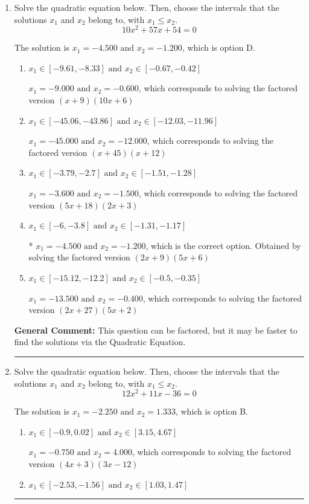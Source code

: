\documentclass{extbook}[14pt]
\newcommand{\litem}[1]{\item #1

\rule{\textwidth}{0.4pt}}
\begin{document}
\begin{enumerate}\litem{
Solve the quadratic equation below. Then, choose the intervals that the solutions $x_1$ and $x_2$ belong to, with $x_1 \leq x_2$.
\[ 10x^{2} +57 x + 54 = 0 \]

The solution is \( x_1 = -4.500 \text{ and } x_2 = -1.200 \), which is option D.\begin{enumerate}[label=\Alph*.]
\item \( x_1 \in [-9.61, -8.33] \text{ and } x_2 \in [-0.67, -0.42] \)

$x_1 = -9.000 \text{ and } x_2 = -0.600$, which corresponds to solving the factored version $(x + 9)(10x + 6)$
\item \( x_1 \in [-45.06, -43.86] \text{ and } x_2 \in [-12.03, -11.96] \)

$x_1 = -45.000 \text{ and } x_2 = -12.000$, which corresponds to solving the factored version $(x + 45)(x + 12)$
\item \( x_1 \in [-3.79, -2.7] \text{ and } x_2 \in [-1.51, -1.28] \)

$x_1 = -3.600 \text{ and } x_2 = -1.500$, which corresponds to solving the factored version $(5x + 18)(2x + 3)$
\item \( x_1 \in [-6, -3.8] \text{ and } x_2 \in [-1.31, -1.17] \)

* $x_1 = -4.500 \text{ and } x_2 = -1.200$, which is the correct option. Obtained by solving the factored version $(2x + 9)(5x + 6)$
\item \( x_1 \in [-15.12, -12.2] \text{ and } x_2 \in [-0.5, -0.35] \)

$x_1 = -13.500 \text{ and } x_2 = -0.400$, which corresponds to solving the factored version $(2x + 27)(5x + 2)$
\end{enumerate}

\textbf{General Comment:} This question can be factored, but it may be faster to find the solutions via the Quadratic Equation.
}
\litem{
Solve the quadratic equation below. Then, choose the intervals that the solutions $x_1$ and $x_2$ belong to, with $x_1 \leq x_2$.
\[ 12x^{2} +11 x -36 = 0 \]

The solution is \( x_1 = -2.250 \text{ and } x_2 = 1.333 \), which is option B.\begin{enumerate}[label=\Alph*.]
\item \( x_1 \in [-0.9, 0.02] \text{ and } x_2 \in [3.15, 4.67] \)

$x_1 = -0.750 \text{ and } x_2 = 4.000$, which corresponds to solving the factored version $(4x + 3)(3x -12)$
\item \( x_1 \in [-2.53, -1.56] \text{ and } x_2 \in [1.03, 1.47] \)


\end{enumerate}}
\end{enumerate}
\end{document}
